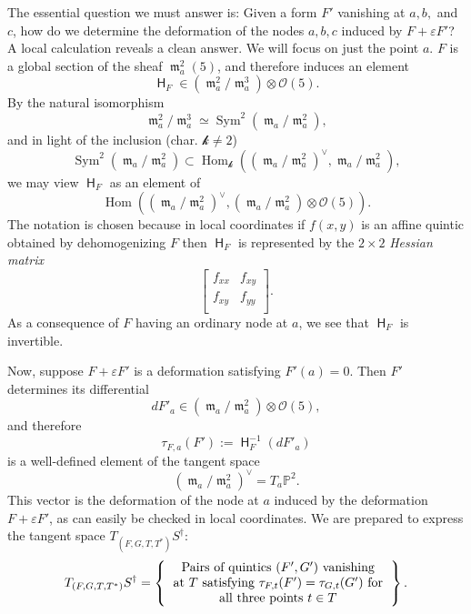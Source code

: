 \documentclass[reqno, 11pt]{amsart}
\theoremstyle{plain}
\theoremstyle{remark}
\renewcommand{\P}{\mathbb{P}}
\renewcommand{\k}{\mathscr{k}}
\DeclareMathOperator{\Hom}{Hom}
\renewcommand{\O}{\mathcal{O}}
\DeclareMathOperator{\Sym}{Sym}
\DeclareMathOperator{\hess}{\mathsf{H}}
\DeclareMathOperator{\m}{\mathfrak{m}}
\begin{document}
    The essential question we must answer is: Given a form $F'$ vanishing at $a,b,$ and $c$, how do we determine the deformation of the nodes $a,b,c$ induced by $F + \varepsilon F'$? A local calculation reveals a clean answer. We will focus on just the point $a$. $F$ is a global section of the sheaf $\m_{a}^{2}(5)$, and therefore induces an element $$\hess_{F} \in \left(\m_{a}^{2}/\m_{a}^{3}\right) \otimes \O(5).$$ By the natural isomorphism $$\m_{a}^{2}/\m_{a}^{3} \simeq \Sym^{2}(\m_{a}/\m_{a}^{2}),$$ and in light of the inclusion (char. $\k \neq 2$) $$\Sym^{2}(\m_{a}/\m_{a}^{2}) \subset \Hom_{\k}\left(\left(\m_{a}/\m_{a}^{2}\right)^{\vee} , \m_{a}/\m_{a}^{2} \right),$$ we may view $\hess_{F}$ as an element of $$\Hom \left(\left(\m_{a}/\m_{a}^{2}\right)^{\vee} , \left(\m_{a}/\m_{a}^{2}\right) \otimes \O(5) \right).$$  The notation is chosen because in local coordinates if $f(x,y)$ is an affine quintic obtained by dehomogenizing $F$ then $\hess_{F}$ is represented by the $2 \times 2$  \emph{Hessian matrix} $$\begin{bmatrix}
        f_{xx} & f_{xy} \\
        f_{xy} & f_{yy} \\
    \end{bmatrix}.$$   As a consequence of $F$ having an ordinary node at $a$, we see that $\hess_{F}$ is invertible.  
    
    Now, suppose $F + \varepsilon F'$ is a deformation satisfying $F'(a) = 0$. Then $F'$ determines its differential $$d F'_{a} \in \left(\m_{a}/\m_{a}^{2}\right) \otimes \O(5),$$ and therefore $$\tau_{F,a}(F') := \hess_{F}^{-1}(d F'_{a})$$ is a well-defined element of the tangent space $$\left(\m_{a}/ \m_{a}^{2} \right)^{\vee} = T_{a}\P^{2}.$$ This vector is the deformation of the node at  $a$ induced by the deformation $F + \varepsilon F'$, as can easily be checked in local coordinates.  We are prepared to  express the tangent space $T_{(F,G,T,T^{*})}S^{\dagger}$: 
    \begin{eqnarray}
    \label{tangentSdagger} T_{(F,G,T,T^{*})}S^{\dagger} = \left\{ \begin{tabular}{c}
            Pairs of quintics $(F',G')$ vanishing \\
            at $T$ 
            satisfying $\tau_{F,t}(F') = \tau_{G,t}(G')$ for \\ all three points $t \in T$
        \end{tabular}
        \right\}.
    \end{eqnarray}
\end{document}
